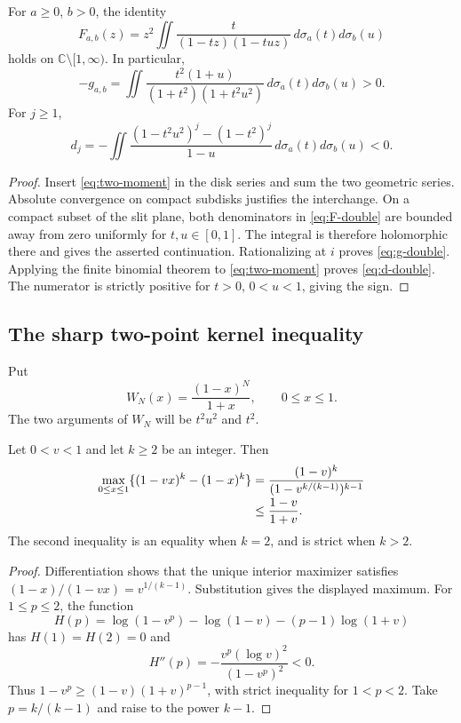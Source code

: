 \begin{lemma}\label{lem:two-measure}
For $a\geq0$, $b>0$, the identity
\begin{equation}\label{eq:F-double}
 F_{a,b}(z)=z^2\iint
        \frac{t}{(1-tz)(1-tuz)}\,d\sigma_a(t)d\sigma_b(u)
\end{equation}
holds on $\mathbb C\setminus[1,\infty)$. In particular,
\begin{equation}\label{eq:g-double}
 -g_{a,b}=\iint\frac{t^2(1+u)}{(1+t^2)(1+t^2u^2)}
                           \,d\sigma_a(t)d\sigma_b(u)>0.
\end{equation}
For $j\geq1$,
\begin{equation}\label{eq:d-double}
 d_j=-\iint\frac{(1-t^2u^2)^j-(1-t^2)^j}{1-u}
                           \,d\sigma_a(t)d\sigma_b(u)<0.
\end{equation}
\end{lemma}
\begin{proof}
Insert \eqref{eq:two-moment} in the disk series and sum the two
geometric series. Absolute convergence on compact subdisks justifies
the interchange. On a compact subset of the slit plane, both denominators
in \eqref{eq:F-double} are bounded away from zero uniformly for
$t,u\in[0,1]$. The integral is therefore holomorphic there and gives
the asserted continuation. Rationalizing at $i$ proves
\eqref{eq:g-double}. Applying the finite binomial theorem to
\eqref{eq:two-moment} proves \eqref{eq:d-double}. The numerator is
strictly positive for $t>0$, $0<u<1$, giving the sign.
\end{proof}

\subsection{The sharp two-point kernel inequality}

Put
\[
 W_N(x)=\frac{(1-x)^N}{1+x},\qquad 0\leq x\leq1.
\]
The two arguments of $W_N$ will be $t^2u^2$ and $t^2$.

\begin{lemma}\label{lem:power-difference}
Let $0<v<1$ and let $k\geq2$ be an integer. Then
\begin{align}\label{eq:power-max}
 \max_{0\leq x\leq1}\{(1-vx)^k-(1-x)^k\}
 &=\frac{(1-v)^k}{(1-v^{k/(k-1)})^{k-1}}\\[-2pt]
 &\leq\frac{1-v}{1+v}.\notag
\end{align}
The second inequality is an equality when $k=2$, and is strict when
$k>2$.
\end{lemma}
\begin{proof}
Differentiation shows that the unique interior maximizer satisfies
$(1-x)/(1-vx)=v^{1/(k-1)}$. Substitution gives the displayed maximum.
For $1\leq p\leq2$, the function
\[
 H(p)=\log(1-v^p)-\log(1-v)-(p-1)\log(1+v)
\]
has $H(1)=H(2)=0$ and
\[
 H''(p)=-\frac{v^p(\log v)^2}{(1-v^p)^2}<0.
\]
Thus $1-v^p\geq(1-v)(1+v)^{p-1}$, with strict inequality
for $1<p<2$. Take $p=k/(k-1)$ and raise to the power $k-1$.
\end{proof}

